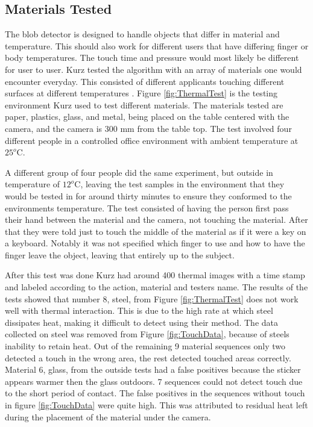 \documentclass{sig-alternate}
\begin{document}
\subsection{Materials Tested}
\label{Materials Tested}
The blob detector is designed to handle objects that differ in material and temperature. This should also work for different users that have differing finger or body temperatures. The touch time and pressure would most likely be different for user to user. Kurz tested the algorithm with an array of materials one would encounter everyday. This consisted of different applicants touching different surfaces at different temperatures \cite{3D}. Figure \ref{fig:ThermalTest} is the testing environment Kurz used to test different materials. The materials tested are paper, plastics, glass, and metal, being placed on the table centered with the camera, and the camera is 300 mm from the table top. The test involved four different people in a controlled office environment with ambient temperature at \(25^o\)C. 

A different group of four people did the same experiment, but outside in temperature of \(12^o\)C, leaving the test samples in the environment that they would be tested in for around thirty minutes to ensure they conformed to the environments temperature. The test consisted of having the person first pass their hand between the material and the camera, not touching the material. After that they were told just to touch the middle of the material as if it were a key on a keyboard. Notably it was not specified which finger to use and how to have the finger leave the object, leaving that entirely up to the subject. 

After this test was done Kurz had around 400 thermal images with a time stamp and labeled according to the action, material and testers name. The results of the tests showed that number 8, steel, from Figure \ref{fig:ThermalTest} does not work well with thermal interaction. This is due to the high rate at which steel dissipates heat, making it difficult to detect using their method. The data collected on steel was removed from Figure \ref{fig:TouchData}, because of steels inability to retain heat. Out of the remaining 9 material sequences only two detected a touch in the wrong area, the rest detected touched areas correctly. Material 6, glass, from the outside tests had a false positives because the sticker appears warmer then the glass outdoors. 7 sequences could not detect touch due to the short period of contact. The false positives in the sequences without touch in figure \ref{fig:TouchData} were quite high. This was attributed to residual heat left during the placement of the material under the camera. 
\end{document}
